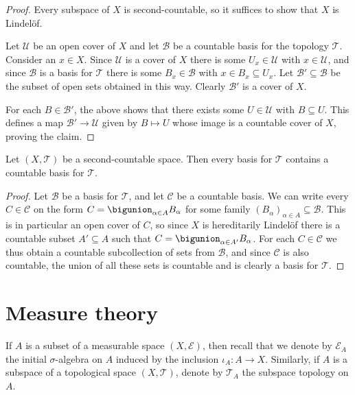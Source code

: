 \documentclass[article, a4paper, 11pt, oneside]{memoir}
\numberwithin{equation}{chapter}
\newcommand{\calT}{\mathcal{T}}
\newcommand{\calU}{\mathcal{U}}
\newcommand{\calB}{\mathcal{B}}
\newcommand{\calE}{\mathcal{E}}
\newcommand{\calC}{\mathcal{C}}
\begin{document}
\begin{proof}
    Every subspace of $X$ is second-countable, so it suffices to show that $X$ is Lindelöf.
    
    Let $\calU$ be an open cover of $X$ and let $\calB$ be a countable basis for the topology $\calT$. Consider an $x \in X$. Since $\calU$ is a cover of $X$ there is some $U_x \in \calU$ with $x \in \calU$, and since $\calB$ is a basis for $\calT$ there is some $B_x \in \calB$ with $x \in B_x \subseteq U_x$. Let $\calB' \subseteq \calB$ be the subset of open sets obtained in this way. Clearly $\calB'$ is a cover of $X$.
    
    For each $B \in \calB'$, the above shows that there exists some $U \in \calU$ with $B \subseteq U$. This defines a map $\calB' \to \calU$ given by $B \mapsto U$ whose image is a countable cover of $X$, proving the claim.
\end{proof}


\begin{lemma}
    \label{thm:countable_basis}
    Let $(X, \calT)$ be a second-countable space. Then every basis for $\calT$ contains a countable basis for $\calT$.
\end{lemma}

\begin{proof}
    Let $\calB$ be a basis for $\calT$, and let $\calC$ be a countable basis. We can write every $C \in \calC$ on the form $C = \bigunion_{\alpha \in A} B_\alpha$ for some family $(B_\alpha)_{\alpha \in A} \subseteq \calB$. This is in particular an open cover of $C$, so since $X$ is hereditarily Lindelöf there is a countable subset $A' \subseteq A$ such that $C = \bigunion_{\alpha \in A'} B_\alpha$. For each $C \in \calC$ we thus obtain a countable subcollection of sets from $\calB$, and since $\calC$ is also countable, the union of all these sets is countable and is clearly a basis for $\calT$.
\end{proof}





\chapter{Measure theory}

If $A$ is a subset of a measurable space $(X, \calE)$, then recall that we denote by $\calE_A$ the initial $\sigma$-algebra on $A$ induced by the inclusion $\iota_A \colon A \to X$. Similarly, if $A$ is a subspace of a topological space $(X, \calT)$, denote by $\calT_A$ the subspace topology on $A$.
\end{document}
